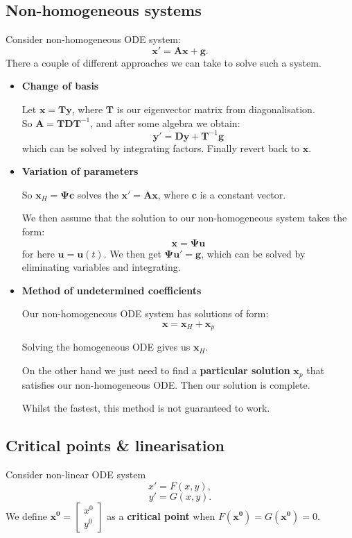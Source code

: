\documentclass{article}
\begin{document}
\subsection{Non-homogeneous systems}
Consider non-homogeneous ODE system:
$$\boldsymbol{x}'=\boldsymbol{A}\boldsymbol{x}+\boldsymbol{g}.$$
There a couple of different approaches we can take to solve such a system.
\begin{itemize}
    \item \textbf{Change of basis}
        
    Let $\boldsymbol{x}=\boldsymbol{T}\boldsymbol{y}$,
    where $\boldsymbol{T}$ is our eigenvector matrix from diagonalisation. \\
    So $\boldsymbol{A}=\boldsymbol{T}\boldsymbol{D}\boldsymbol{T}^{-1}$,
    and after some algebra we obtain:
    $$\boldsymbol{y}'=\boldsymbol{D}\boldsymbol{y}+\boldsymbol{T}^{-1}\boldsymbol{g}$$
    which can be solved by integrating factors. Finally revert back to $\boldsymbol{x}$.

    \item \textbf{Variation of parameters}

    So $\boldsymbol{x}_H=\boldsymbol{\Psi}\boldsymbol{c}$ solves the $\boldsymbol{x}'=\boldsymbol{A}\boldsymbol{x}$,
    where $\boldsymbol{c}$ is a constant vector.
        
    We then assume that the solution to our non-homogeneous system takes the form:
    $$\boldsymbol{x}=\boldsymbol{\Psi}\boldsymbol{u}$$
    for here $\boldsymbol{u} = \boldsymbol{u}(t)$. We then get $\boldsymbol{\Psi}\boldsymbol{u}'=\boldsymbol{g}$,
    which can be solved by eliminating variables and integrating.

    \item \textbf{Method of undetermined coefficients}

    Our non-homogeneous ODE system has solutions of form:
    $$\boldsymbol{x}=\boldsymbol{x}_H + \boldsymbol{x}_p$$

    Solving the homogeneous ODE gives us $\boldsymbol{x}_H$.
        
    On the other hand we just need to find a \textbf{particular solution}
    $\boldsymbol{x}_p$ that satisfies our non-homogeneous ODE. Then our solution is complete.

    Whilst the fastest, this method is not guaranteed to work.        
    \end{itemize}
    
\newpage

\subsection{Critical points \& linearisation}
Consider non-linear ODE system
$$x'=F(x, y),$$
$$y'=G(x, y).$$
We define $\boldsymbol{x^0}=\begin{bmatrix} x^0 \\ y^0 \end{bmatrix}$
as a \textbf{critical point} when $F(\boldsymbol{x^0})=G(\boldsymbol{x^0})=0$.
\end{document}
